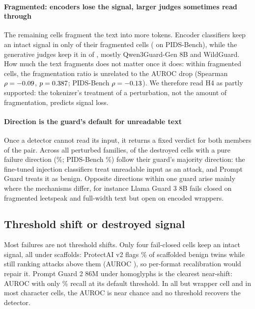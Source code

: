 \documentclass[conference]{IEEEtran}
\begin{document}
\paragraph{Fragmented: encoders lose the signal, larger judges sometimes read through} The remaining \mechObfFragmented{} cells fragment the text into more tokens. Encoder classifiers keep an intact signal in only \mechObfFragEncIntact{} of their \mechObfFragEnc{} fragmented cells (\mechPidsFragEncIntact{} on PIDS-Bench), while the generative judges keep it in \mechObfFragJudgeIntact{} of \mechObfFragJudge{}, mostly Qwen3Guard-Gen 8B and WildGuard. How much the text fragments does not matter once it does: within fragmented cells, the fragmentation ratio is unrelated to the AUROC drop (Spearman $\rho = -0.09$, $p = 0.387$; PIDS-Bench $\rho = -0.13$). We therefore read H4 as partly supported: the tokenizer's treatment of a perturbation, not the amount of fragmentation, predicts signal loss.

\paragraph{Direction is the guard's default for unreadable text} Once a detector cannot read its input, it returns a fixed verdict for both members of the pair. Across all perturbed families, \mechObfDirMajority{} of the \mechObfDirCells{} destroyed cells with a pure failure direction (\mechObfDirPct\%; PIDS-Bench \mechPidsDirPct\%) follow their guard's majority direction: the fine-tuned injection classifiers treat unreadable input as an attack, and Prompt Guard treats it as benign. Opposite directions within one guard arise mainly where the mechanisms differ, for instance Llama Guard 3 8B fails closed on fragmented leetspeak and full-width text but open on encoded wrappers.

\subsection{Threshold shift or destroyed signal}

Most failures are not threshold shifts. Only four fail-closed cells keep an intact signal, all under scaffolds: ProtectAI v2 flags \protectaiBsfScaffoldFPR\% of scaffolded benign twins while still ranking attacks above them (AUROC \protectaiBsfScaffoldAUC), so per-format recalibration would repair it. Prompt Guard 2 86M under homoglyphs is the clearest near-shift: AUROC \pgTwoEightSixHomoAUC{} with only \pgTwoEightSixHomoTPR\% recall at its default threshold. In all but \nWrapNotDestroyed{} wrapper cell and in most character cells, the AUROC is near chance and no threshold recovers the detector.
\end{document}
